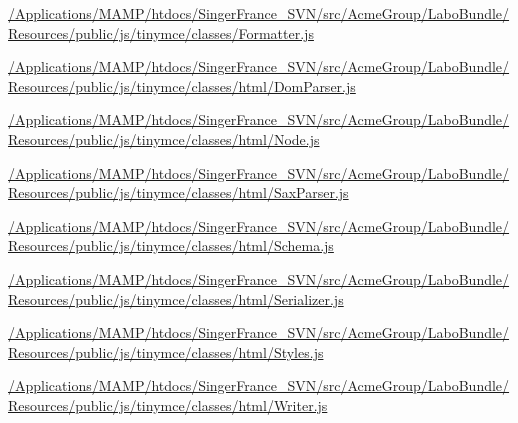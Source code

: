 \begin{DoxyCompactItemize}
\item 
\hyperlink{_2_applications_2_m_a_m_p_2htdocs_2_singer_france__s_v_n_2src_2_acme_group_2_labo_bundle_2_resou6d6c1c8f8d6f0116bfd7e0c61305c1c4}{/\+Applications/\+M\+A\+M\+P/htdocs/\+Singer\+France\+\_\+\+S\+V\+N/src/\+Acme\+Group/\+Labo\+Bundle/\+Resources/public/js/tinymce/classes/\+Formatter.\+js}
\item 
\hyperlink{_2_applications_2_m_a_m_p_2htdocs_2_singer_france__s_v_n_2src_2_acme_group_2_labo_bundle_2_resoufac8934c3679d076175cf964af95d5d6}{/\+Applications/\+M\+A\+M\+P/htdocs/\+Singer\+France\+\_\+\+S\+V\+N/src/\+Acme\+Group/\+Labo\+Bundle/\+Resources/public/js/tinymce/classes/html/\+Dom\+Parser.\+js}
\item 
\hyperlink{_2_applications_2_m_a_m_p_2htdocs_2_singer_france__s_v_n_2src_2_acme_group_2_labo_bundle_2_resou3ee1d357c72aada161ec9576f416035e}{/\+Applications/\+M\+A\+M\+P/htdocs/\+Singer\+France\+\_\+\+S\+V\+N/src/\+Acme\+Group/\+Labo\+Bundle/\+Resources/public/js/tinymce/classes/html/\+Node.\+js}
\item 
\hyperlink{_2_applications_2_m_a_m_p_2htdocs_2_singer_france__s_v_n_2src_2_acme_group_2_labo_bundle_2_resou639247e417f9eac4fb5641f456d4ec22}{/\+Applications/\+M\+A\+M\+P/htdocs/\+Singer\+France\+\_\+\+S\+V\+N/src/\+Acme\+Group/\+Labo\+Bundle/\+Resources/public/js/tinymce/classes/html/\+Sax\+Parser.\+js}
\item 
\hyperlink{_2_applications_2_m_a_m_p_2htdocs_2_singer_france__s_v_n_2src_2_acme_group_2_labo_bundle_2_resou8e3613b62b7b0350ec49055cd0ec1f72}{/\+Applications/\+M\+A\+M\+P/htdocs/\+Singer\+France\+\_\+\+S\+V\+N/src/\+Acme\+Group/\+Labo\+Bundle/\+Resources/public/js/tinymce/classes/html/\+Schema.\+js}
\item 
\hyperlink{_2_applications_2_m_a_m_p_2htdocs_2_singer_france__s_v_n_2src_2_acme_group_2_labo_bundle_2_resou83f45805ddb9849b2f74b3f014a096de}{/\+Applications/\+M\+A\+M\+P/htdocs/\+Singer\+France\+\_\+\+S\+V\+N/src/\+Acme\+Group/\+Labo\+Bundle/\+Resources/public/js/tinymce/classes/html/\+Serializer.\+js}
\item 
\hyperlink{_2_applications_2_m_a_m_p_2htdocs_2_singer_france__s_v_n_2src_2_acme_group_2_labo_bundle_2_resou723ce03bdfbe566b9a2764ca61591677}{/\+Applications/\+M\+A\+M\+P/htdocs/\+Singer\+France\+\_\+\+S\+V\+N/src/\+Acme\+Group/\+Labo\+Bundle/\+Resources/public/js/tinymce/classes/html/\+Styles.\+js}
\item 
\hyperlink{_2_applications_2_m_a_m_p_2htdocs_2_singer_france__s_v_n_2src_2_acme_group_2_labo_bundle_2_resou189f554233a0279bb7d50f7405c2cbb5}{/\+Applications/\+M\+A\+M\+P/htdocs/\+Singer\+France\+\_\+\+S\+V\+N/src/\+Acme\+Group/\+Labo\+Bundle/\+Resources/public/js/tinymce/classes/html/\+Writer.\+js}

\end{DoxyCompactItemize}
